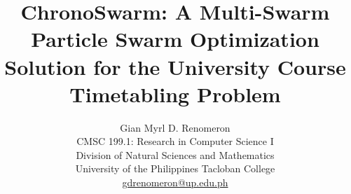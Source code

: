 \documentclass{article}
\begin{document}
\onehalfspacing

\title{\textbf{ChronoSwarm: A Multi-Swarm Particle Swarm Optimization Solution for the University Course Timetabling Problem}}
\author{Gian Myrl D. Renomeron\\
    CMSC 199.1: Research in Computer Science I\\
    Division of Natural Sciences and Mathematics\\
    University of the Philippines Tacloban College\\
    {\small \href{mailto:gdrenomeron@up.edu.ph}{gdrenomeron@up.edu.ph}}
}
\date{}

\maketitle

\pagebreak


\pagebreak
\tableofcontents
\pagebreak












\printbibliography 
\end{document}
